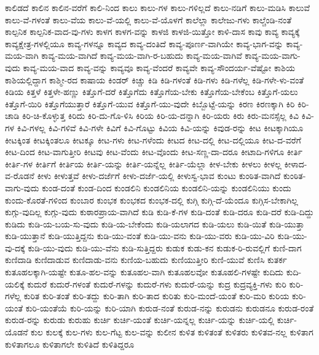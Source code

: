 {ಕಾಲಿಡದೆ
ಕಾಲಿನ
ಕಾಲಿನ-ವರೆಗೆ
ಕಾಲಿ-ನಿಂದ
ಕಾಲು
ಕಾಲು-ಗಳ
ಕಾಲು-ಗಳಿಲ್ಲದೆ
ಕಾಲು-ನಡಿಗೆ
ಕಾಲು-ಮಡಿಸಿ
ಕಾಲುವೆ
ಕಾಲು-ವೆ-ಗಳಂತೆ
ಕಾಲು-ವೆಯ
ಕಾಲು-ವೆ-ಯಲ್ಲಿ
ಕಾಲು-ವೆ-ಯೊಳಗೆ
ಕಾಲೆಲ್ಲಾ
ಕಾಲೇಜು-ಗಳು
ಕಾಲ್ಚೆಂಡಿ-ನಂತೆ
ಕಾಲ್ಪನಿಕ
ಕಾಲ್ಪನಿಕ-ವಾದ-ವು-ಗಳು
ಕಾಳಗ
ಕಾಳಗ-ವನ್ನು
ಕಾಳಜಿ
ಕಾಳಜಿ-ಯಿತ್ತೋ
ಕಾಳಿ-ದಾಸ
ಕಾವು
ಕಾವ್ಯ
ಕಾವ್ಯಕ್ಕೆ
ಕಾವ್ಯಕ್ಷೇತ್ರ-ಗಳಲ್ಲಿಯೂ
ಕಾವ್ಯ-ಗಳನ್ನೂ
ಕಾವ್ಯದ
ಕಾವ್ಯ-ದಂತಿದೆ
ಕಾವ್ಯ-ಪೂರ್ಣ-ವಾಗಿಯೇ
ಕಾವ್ಯ-ಭಾಗ-ವನ್ನು
ಕಾವ್ಯ-ಮಯ-ವಾಗಿ
ಕಾವ್ಯ-ಮಯ-ವಾಗಿದೆ
ಕಾವ್ಯ-ಮಯ-ವಾಗಿ-ರ-ಬಹುದು
ಕಾವ್ಯ-ಮಯ-ವಾಗಿವೆ
ಕಾವ್ಯ-ಮಯ-ವಾಗು-ವುದು
ಕಾವ್ಯ-ಮಯ-ವಾದ
ಕಾವ್ಯ-ವನ್ನು
ಕಾವ್ಯವೂ
ಕಾವ್ಯ-ವೆಂದರೆ
ಕಾವ್ಯವೇ
ಕಾವ್ಯ-ಸೌಂದರ್ಯ-ವೆಷ್ಟೋ
ಕಾಶಿಯ
ಕಾಶಿಯಲ್ಲಿದ್ದಾಗ
ಕಾಶ್ಮೀ-ರದ
ಕಾಷಾಯ
ಕಿಂಡರ್
ಕಿಚ್ಚು
ಕಿಡಿ
ಕಿಡಿ-ಗಳಂತೆ
ಕಿಡಿ-ಗಳು
ಕಿಡಿ-ಗಳೆಲ್ಲ
ಕಿಡಿ-ಗಳೇ-ಳು-ವಂತೆ
ಕಿಡಿಯ
ಕಿತ್ತಳೆ
ಕಿತ್ತಳೇ-ಹಣ್ಣು
ಕಿತ್ತೊಗೆ-ದರೆ
ಕಿತ್ತೊಗೆದು
ಕಿತ್ತೊಗೆಯ-ಬೇಕು
ಕಿತ್ತೊಗೆಯ-ಬೇಕೆಂಬ
ಕಿತ್ತೊಗೆ-ಯಲು
ಕಿತ್ತೊಗೆ-ಯಿರಿ
ಕಿತ್ತೊಗೆಯುತ್ತಾರೆ
ಕಿತ್ತೊಗೆ-ಯುವ
ಕಿತ್ತೊಗೆ-ಯು-ವುದೇ
ಕಿಬ್ಬೊಟ್ಟೆ-ಯನ್ನು
ಕಿರಣ
ಕಿರಣಕ್ಕಾಗಿ
ಕಿರಿ
ಕಿರಿ-ಚಾಡಿ
ಕಿರಿ-ಚಿ-ಕೊಳ್ಳುತ್ತ
ಕಿರಿದು
ಕಿರಿ-ದು-ಗೊ-ಳಿಸಿ
ಕಿರಿಯ
ಕಿರಿ-ಯ-ದನ್ನಾಗಿ
ಕಿರಿ-ಯರು
ಕಿರು
ಕಿರು-ಮನಸ್ಸೆಲ್ಲ
ಕಿವಿ
ಕಿವಿ-ಗಳ
ಕಿವಿ-ಗಳಲ್ಲ
ಕಿವಿ-ಗಳಿವೆ
ಕಿವಿ-ಗಳೇ
ಕಿವಿಗೆ
ಕಿವಿ-ಗೊಟ್ಟು
ಕಿವಿಯ
ಕಿವಿ-ಯನ್ನು
ಕಿವುಡ-ರನ್ನು
ಕೀಟ
ಕೀಟಕ್ಕಾಗಿಯೂ
ಕೀಟಕ್ಕಿಂತ
ಕೀಟಕ್ಕಿಂತಲೂ
ಕೀಟಕ್ಕೂ
ಕೀಟ-ಗಳು
ಕೀಟ-ಗಳೆಂದು
ಕೀಟದ
ಕೀಟ-ದಲ್ಲಿ
ಕೀಟ-ದಲ್ಲಿಯೂ
ಕೀಟ-ದ-ವರೆಗೆ
ಕೀಟ-ದಿಂದ
ಕೀಟ-ವಾಗುತ್ತೀರಿ
ಕೀಟವು
ಕೀಟ-ವೆಂದು
ಕೀಟ-ವೊಂದು
ಕೀಟ-ಸಣ್ಣ-ದಾ-ದರೂ
ಕೀಟಾದಿ-ಗಳಿಗೂ
ಕೀರ್ತಿ
ಕೀರ್ತಿ-ಗಳ
ಕೀರ್ತಿಗೆ
ಕೀರ್ತಿಯ
ಕೀರ್ತಿ-ಯನ್ನು
ಕೀರ್ತಿ-ಯನ್ನೆಲ್ಲ
ಕೀರ್ತಿ-ಯೆಲ್ಲಾ
ಕೀಳ-ಬೇಕು
ಕೀಳಲು
ಕೀಳಲ್ಲ
ಕೀಳಾದ-ವ-ರೊಡನೆ
ಕೀಳು
ಕೀಳುತ್ತವೆ
ಕೀಳು-ದರ್ಜೆಗೆ
ಕೀಳು-ದರ್ಜೆ-ಯಲ್ಲಿ
ಕೀಳುಸ್ವ-ಭಾವ
ಕುಂಟು
ಕುಂಠಿತ-ವಾಗಿದೆ
ಕುಂಠಿತ-ವಾಗು-ವುದು
ಕುಂಡ-ದಂತೆ
ಕುಂಡ-ದಿಂದ
ಕುಂಡಲಿನಿ
ಕುಂಡಲಿನಿಯ
ಕುಂಡಲಿನಿ-ಯನ್ನು
ಕುಂಡಲಿನಿಯು
ಕುಂದು
ಕುಂದು-ಕೊರತೆ-ಗಳಿಂದ
ಕುಂಬಾರ
ಕುಂಭಕ
ಕುಂಭಕದ
ಕುಂಭಕ-ದಲ್ಲಿ
ಕುಗ್ಗಿ
ಕುಗ್ಗಿ-ದೆ-ಯೆಂದೂ
ಕುಗ್ಗಿಸ-ಬೇಕಾಗಿಲ್ಲ
ಕುಗ್ಗು-ವುದಿಲ್ಲ
ಕುಗ್ಗು-ವುದು
ಕುಠಾರಪ್ರಾಯ-ವಾಗಿದೆ
ಕುಡಿ
ಕುಡಿ-ಕೆ-ಗಳ
ಕುಡಿ-ದಂತೆ
ಕುಡಿ-ದರೂ
ಕುಡಿ-ದರೆ
ಕುಡಿ-ದಿದ್ದು
ಕುಡಿದು
ಕುಡಿ-ಯ-ಬಯ-ಸು-ವುದು
ಕುಡಿ-ಯ-ಬೇಕೆಂದು
ಕುಡಿ-ಯಲಾಗದ
ಕುಡಿ-ಯಲು
ಕುಡಿ-ಯಿತೆ
ಕುಡಿ-ಯುತ್ತಾ
ಕುಡಿ-ಯುತ್ತಾನೆ
ಕುಡಿ-ಯುತ್ತಿದ್ದನು
ಕುಡಿ-ಯು-ವಂತೆ
ಕುಡಿ-ಯು-ವನು
ಕುಡಿ-ಯು-ವರು
ಕುಡಿ-ಯು-ವಿರಿ
ಕುಡಿ-ಯು-ವು-ದಕ್ಕೆ
ಕುಡಿ-ಯು-ವುದು
ಕುಡಿ-ಯು-ವೆನು
ಕುಡಿ-ಸುತ್ತಿದ್ದರು
ಕುಡುಕ
ಕುಡು-ಕನ
ಕುಡುಕ-ರಿ-ರುವಲ್ಲಿಗೆ
ಕುಣಿ-ದಾಗ
ಕುಣಿದಾಡಿ
ಕುಣಿದಾಡುವ
ಕುಣಿದಾಡು-ವನು
ಕುಣಿಯ-ಬಹುದು
ಕುಣಿಯುತ್ತೀರಿ
ಕುಣಿ-ಯುವೆ
ಕುಣಿಸಿ
ಕುತರ್ಕ
ಕುತೂಹಲಕ್ಕಾಗಿ-ಯಷ್ಟೇ
ಕುತೂ-ಹಲ-ವನ್ನು
ಕುತೂಹಲ-ವಾಗಿ
ಕುತೂಹಲವೋ
ಕುತೂಹಲಿ-ಗಳಷ್ಟೇ
ಕುದಿದು
ಕುದಿ-ಯಲಿಕ್ಕೆ
ಕುದುರೆ
ಕುದುರೆ-ಗಳಂತೆ
ಕುದುರೆ-ಗಳನ್ನು
ಕುದುರೆ-ಗಳು
ಕುದುರೆ-ಯನ್ನು
ಕುದ್ರ
ಕುದ್ರವ್ಯಕ್ತಿ-ಗಳು
ಕುರಿ
ಕುರಿ-ಗಳೆಲ್ಲ
ಕುರಿತ
ಕುರಿ-ತಂತೆ
ಕುರಿ-ತದ್ದು
ಕುರಿ-ತಾಗಿ
ಕುರಿ-ತಾದ
ಕುರಿತು
ಕುರಿ-ಮಂದೆ-ಯಂತೆ
ಕುರಿ-ಮರಿ
ಕುರಿಯ
ಕುರಿ-ಯಂತೆ
ಕುರಿ-ಯಂತೆಯೆ
ಕುರಿ-ಯನ್ನು
ಕುರಿ-ಯಾಗಿ
ಕುರುಡ-ನಂತೆ
ಕುರುಡ-ನನ್ನು
ಕುರುಡನು
ಕುರುಡನೂ
ಕುರುಡ-ರಂತೆ
ಕುರುಡ-ರನ್ನು
ಕುರುಡು
ಕುರುಹು
ಕುರ್ಚಿ
ಕುರ್ಚಿ-ಯಂತೆ
ಕುರ್ಚಿ-ಯನ್ನಲ್ಲ
ಕುರ್ಚಿ-ಯನ್ನು
ಕುರ್ಚಿ-ಯಲ್ಲಿ
ಕುರ್ಚಿ-ಯೊಡನೆ
ಕುಲ
ಕುಲಕ್ಕೆ
ಕುಲ-ಗಳು
ಕುಲ-ಗೆಟ್ಟ
ಕುಲ-ವನ್ನು
ಕುಲೀನ
ಕುಳಿತ
ಕುಳಿತಂತೆ
ಕುಳಿತರು
ಕುಳಿತವ-ನಲ್ಲ
ಕುಳಿತಾಗ
ಕುಳಿತಾಗಲೂ
ಕುಳಿತಾಗಲೇ
ಕುಳಿತಿದೆ
ಕುಳಿತಿದ್ದರೂ
}
